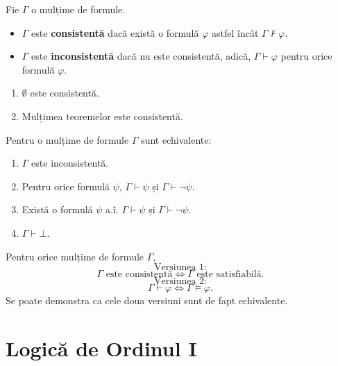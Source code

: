 \begin{definition}
    Fie $\Gamma$ o mulțime de formule.
    \begin{itemize}
        \item $\Gamma$ este \textbf{consistentă} dacă există o formulă $\varphi$ astfel încât $\Gamma \not\vdash \varphi$.
        \item $\Gamma$ este \textbf{inconsistentă} dacă nu este consistentă, adică, $\Gamma \vdash \varphi$ pentru orice formulă $\varphi$.
    \end{itemize}
\end{definition}

\begin{prop}
    \begin{enumerate}
        \item[(i)] $\emptyset$ este consistentă.
        \item[(ii)] Mulțimea teoremelor este consistentă.
    \end{enumerate}
\end{prop}

\newpage

\begin{prop}
    Pentru o mulțime de formule $\Gamma$ sunt echivalente:
    \begin{enumerate}
        \item[(i)] $\Gamma$ este inconsistentă.
        \item[(ii)] Pentru orice formulă $\psi$, $\Gamma \vdash \psi$ și $\Gamma \vdash \neg\psi$.
        \item[(iii)] Există o formulă $\psi$ a.î. $\Gamma \vdash \psi$ și $\Gamma \vdash \neg\psi$.
        \item[(iv)] $\Gamma \vdash \bot$.
    \end{enumerate}
\end{prop}

\begin{theorem}
    Pentru orice mulțime de formule $\Gamma$,
	\[\text{Versiunea 1:}\]
    \[
        \Gamma \text{ este consistentă} \iff \Gamma \text{ este satisfiabilă}.
    \]
	\[\text{Versiunea 2:}\]
	\[
        \Gamma \vdash \varphi \iff \Gamma \models \varphi.
    \]
    Se poate demonstra ca cele doua versiuni sunt de fapt echivalente.
\end{theorem}

\section{Logică de Ordinul I}

